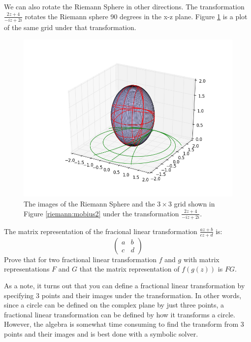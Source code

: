 We can also rotate the Riemann Sphere in other directions.
The transformation $\frac{2z+4}{-iz+2i}$ rotates the Riemann sphere 90 degrees in the x-z plane.
Figure \ref{riemann:mobius5} is a plot of the same grid under that transformation.

\begin{figure}
\includegraphics[width=\textwidth]{mobius5.png}
\caption{The images of the Riemann Sphere and the $3\times 3$ grid shown in Figure \ref{riemann:mobius2} under the transformation $\frac{2z+4}{-iz+2i}$.}
\label{riemann:mobius5}
\end{figure}

\begin{problem}
The matrix representation of the fracional linear transformation $\frac{az+b}{cz+d}$ is:
\[
\begin{pmatrix}
a&b\\
c&d
\end{pmatrix}
\]
Prove that for two fractional linear transformation $f$ and $g$ with matrix representations $F$ and $G$ that the matrix representation of $f(g(z))$ is $FG$.
\end{problem}

As a note, it turns out that you can define a fractional linear transformation by specifying 3 points and their images under the transformation. In other words, since a circle can be defined on the complex plane by just three points, a fractional linear transformation can be defined by how it transforms a circle. However, the algebra is somewhat time consuming to find the transform from 3 points and their images and is best done with a symbolic solver.

